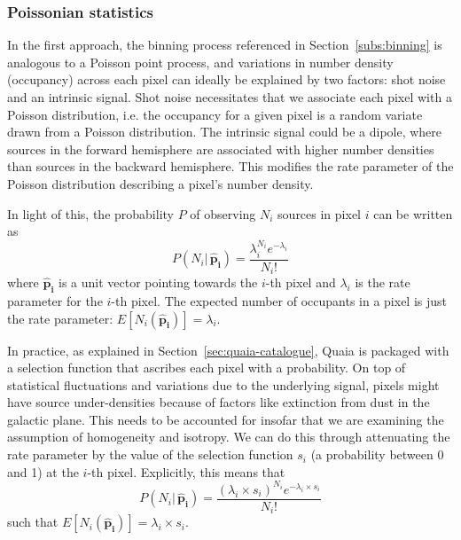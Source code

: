 \documentclass[fleqn,usenatbib]{mnras}
\begin{document}
            \subsubsection{Poissonian statistics}
                In the first approach, the binning process referenced in Section~\ref{subs:binning} is analogous to a Poisson point process, and variations in number density (occupancy) across each pixel can ideally be explained by two factors: shot noise and an intrinsic signal.
                Shot noise necessitates that we associate each pixel with a Poisson distribution, i.e. the occupancy for a given pixel is a random variate drawn from a Poisson distribution.
                The intrinsic signal could be a dipole, where sources in the forward hemisphere are associated with higher number densities than sources in the backward hemisphere.
                This modifies the rate parameter of the Poisson distribution describing a pixel's number density.

                In light of this, the probability $P$ of observing $N_i$ sources in pixel $i$ can be written as
                \begin{equation}
                    P(N_i | \, \mathbf{\hat{p}_i} ) = \frac{\lambda_i^{N_i} e^{-\lambda_i}}{N_i!}
                \end{equation}
                where $\mathbf{\hat{p}_i}$ is a unit vector pointing towards the $i$-th pixel and $\lambda_i$ is the rate parameter for the $i$-th pixel.
                The expected number of occupants in a pixel is just the rate parameter: $E [N_i (\mathbf{\hat{p}_i})] = \lambda_i$.

                In practice, as explained in Section~\ref{sec:quaia-catalogue}, Quaia is packaged with a selection function that ascribes each pixel with a probability.
                On top of statistical fluctuations and variations due to the underlying signal, pixels might have source under-densities because of factors like extinction from dust in the galactic plane.
                This needs to be accounted for insofar that we are examining the assumption of homogeneity and isotropy.
                We can do this through attenuating the rate parameter by the value of the selection function $s_i$ (a probability between 0 and 1) at the $i$-th pixel.
                Explicitly, this means that
                \begin{equation}
                    P(N_i | \, \mathbf{\hat{p}_i} ) = \frac{(\lambda_i \times s_i)^{N_i} e^{-\lambda_i \times s_i}}{N_i!} \label{eq:poisson-prob}
                \end{equation}
                such that $E [N_i (\mathbf{\hat{p}_i})] = \lambda_i \times s_i$.
\end{document}
